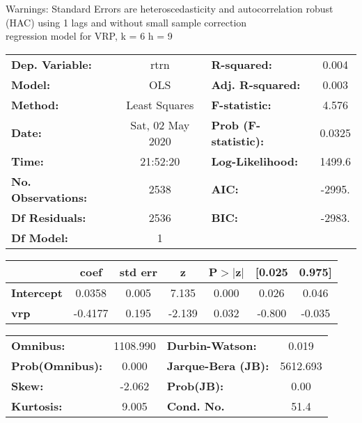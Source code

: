 Warnings: \newline
 [1] Standard Errors are heteroscedasticity and autocorrelation robust (HAC) using 1 lags and without small sample correction\\ 

regression model for VRP, k = 6 h = 9\begin{center}
\begin{tabular}{lclc}
\toprule
\textbf{Dep. Variable:}    &       rtrn       & \textbf{  R-squared:         } &     0.004   \\
\textbf{Model:}            &       OLS        & \textbf{  Adj. R-squared:    } &     0.003   \\
\textbf{Method:}           &  Least Squares   & \textbf{  F-statistic:       } &     4.576   \\
\textbf{Date:}             & Sat, 02 May 2020 & \textbf{  Prob (F-statistic):} &   0.0325    \\
\textbf{Time:}             &     21:52:20     & \textbf{  Log-Likelihood:    } &    1499.6   \\
\textbf{No. Observations:} &        2538      & \textbf{  AIC:               } &    -2995.   \\
\textbf{Df Residuals:}     &        2536      & \textbf{  BIC:               } &    -2983.   \\
\textbf{Df Model:}         &           1      & \textbf{                     } &             \\
\bottomrule
\end{tabular}
\begin{tabular}{lcccccc}
                   & \textbf{coef} & \textbf{std err} & \textbf{z} & \textbf{P$> |$z$|$} & \textbf{[0.025} & \textbf{0.975]}  \\
\midrule
\textbf{Intercept} &       0.0358  &        0.005     &     7.135  &         0.000        &        0.026    &        0.046     \\
\textbf{vrp}       &      -0.4177  &        0.195     &    -2.139  &         0.032        &       -0.800    &       -0.035     \\
\bottomrule
\end{tabular}
\begin{tabular}{lclc}
\textbf{Omnibus:}       & 1108.990 & \textbf{  Durbin-Watson:     } &    0.019  \\
\textbf{Prob(Omnibus):} &   0.000  & \textbf{  Jarque-Bera (JB):  } & 5612.693  \\
\textbf{Skew:}          &  -2.062  & \textbf{  Prob(JB):          } &     0.00  \\
\textbf{Kurtosis:}      &   9.005  & \textbf{  Cond. No.          } &     51.4  \\
\bottomrule
\end{tabular}
\end{center}

